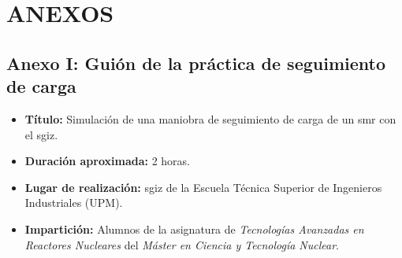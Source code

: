 
\newpage
\section*{ANEXOS} \label{sec:anexos} %

\renewcommand{\thesubsection}{\Alph{subsection}} %
\renewcommand{\thetable}{\Alph{subsection}.\arabic{table}}
\renewcommand{\thefigure}{\Alph{subsection}.\arabic{figure}}

\setcounter{subsection}{0}
\setcounter{table}{0}
\setcounter{figure}{0}
\subsection{Anexo I: Guión de la práctica de seguimiento de carga} \label{sec:anexo1}

\begin{itemize}
    \item \textbf{Título:} Simulación de una maniobra de seguimiento de carga de un \acrshort{smr} con el \acrshort{sgiz}.
    \item \textbf{Duración aproximada:} 2 horas.
    \item \textbf{Lugar de realización:} \acrfull{sgiz} de la Escuela Técnica Superior de Ingenieros Industriales (UPM).
    \item \textbf{Impartición:} Alumnos de la asignatura de \textit{Tecnologías Avanzadas en Reactores Nucleares} del \textit{Máster en Ciencia y Tecnología Nuclear}.
\end{itemize}

